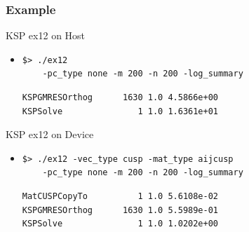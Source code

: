 \begin{frame}[fragile]
\frametitle{Example}
  \begin{block}{KSP ex12 on Host}
  \begin{itemize}
   \item
    \begin{lstlisting}
$> ./ex12 
    -pc_type none -m 200 -n 200 -log_summary
    \end{lstlisting}
    \begin{lstlisting}
KSPGMRESOrthog      1630 1.0 4.5866e+00
KSPSolve               1 1.0 1.6361e+01
    \end{lstlisting}

  \end{itemize}
  \end{block}

  
  \begin{block}{KSP ex12 on Device}
  \begin{itemize}
   \item
    \begin{lstlisting}
$> ./ex12 -vec_type cusp -mat_type aijcusp
    -pc_type none -m 200 -n 200 -log_summary
    \end{lstlisting}
    \begin{lstlisting}
MatCUSPCopyTo          1 1.0 5.6108e-02
KSPGMRESOrthog      1630 1.0 5.5989e-01
KSPSolve               1 1.0 1.0202e+00
    \end{lstlisting}

  \end{itemize}
  \end{block}

\end{frame}


